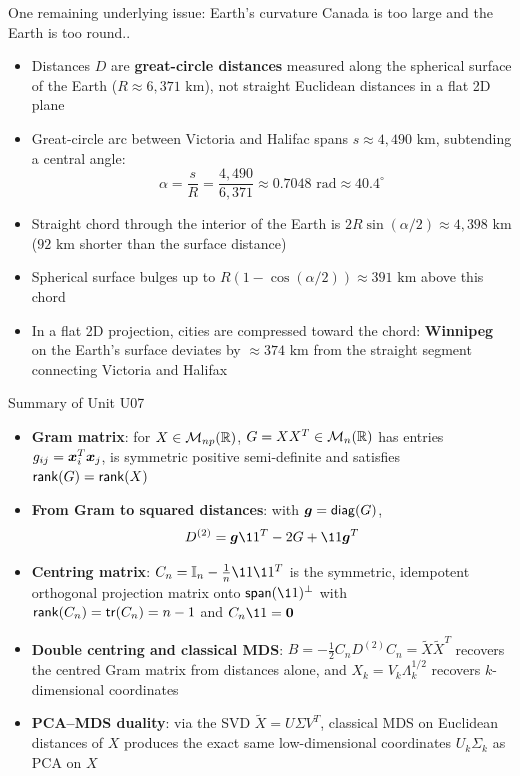 \documentclass[aspectratio=169]{beamer}\usepackage[]{graphicx}\usepackage[]{xcolor}
\begin{document}
\begin{frame}{One remaining underlying issue: Earth's curvature}
Canada is too large and the Earth is too round..
\vfill
\begin{itemize}
\item Distances $D$ are \textbf{great-circle distances} measured along the spherical surface of the Earth ($R \approx 6,371\text{ km}$), not straight Euclidean distances in a flat 2D plane
\vfill
\item Great-circle arc between Victoria and Halifac spans $s \approx 4,490\text{ km}$, subtending a central angle:
\[
\alpha = \frac{s}{R} = \frac{4,490}{6,371} \approx 0.7048\text{ rad} \approx 40.4^\circ
\]
\vfill
\item Straight chord through the interior of the Earth is $2R\sin(\alpha/2) \approx 4,398\text{ km}$ ($92\text{ km}$ shorter than the surface distance)
\vfill
\item Spherical surface bulges up to $R(1-\cos(\alpha/2)) \approx 391\text{ km}$ above this chord
\vfill
\item In a flat 2D projection, cities are compressed toward the chord: \textbf{Winnipeg} on the Earth's surface deviates by $\approx 374\text{ km}$ from the straight segment connecting Victoria and Halifax
\end{itemize}
\end{frame}





\begin{frame}{Summary of Unit U07}
\begin{itemize}
\item \textbf{Gram matrix}: for $X\in\mathcal{M}_{np}(\mathbb{R})$, $G = XX^T\in\mathcal{M}_n(\mathbb{R})$ has entries $g_{ij} = \bm{x}_i^T\bm{x}_j$, is symmetric positive semi-definite and satisfies $\mathsf{rank}(G) = \mathsf{rank}(X)$
\vfill
\item \textbf{From Gram to squared distances}: with $\bm{g} = \mathsf{diag}(G)$,
\[
D^{(2)} = \bg\11^T - 2G + \11\bg^T
\]
\vfill
\item \textbf{Centring matrix}: $C_n = \II_n - \frac{1}{n}\11\11^T$ is the symmetric, idempotent orthogonal projection matrix onto $\Span(\11)^\perp$ with $\mathsf{rank}(C_n) = \mathsf{tr}(C_n) = n-1$ and $C_n\11 = \b0$
\vfill
\item \textbf{Double centring and classical MDS}: $B = -\frac{1}{2}C_n D^{(2)} C_n = \widetilde{X}\widetilde{X}^T$ recovers the centred Gram matrix from distances alone, and $X_k = V_k \Lambda_k^{1/2}$ recovers $k$-dimensional coordinates
\vfill
\item \textbf{PCA--MDS duality}: via the SVD $\widetilde{X} = U\Sigma V^T$, classical MDS on Euclidean distances of $X$ produces the exact same low-dimensional coordinates $U_k\Sigma_k$ as PCA on $X$
\end{itemize}
\end{frame}





\end{document}
